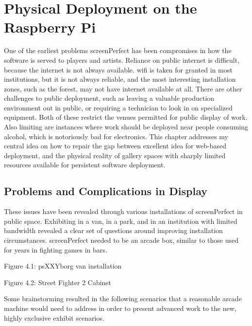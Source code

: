 \section{Physical Deployment on the Raspberry Pi}
One of the earliest problems screenPerfect has been compromises in how the software is served to players and artists. Reliance on public internet is difficult, because the internet is not always available. wifi is taken for granted in most institutions, but it is not always reliable, and the most interesting installation zones, such as the forest, may not have internet available at all. 
There are other challenges to public deployment, such as leaving a valuable production environment out in public, or requiring a technician to look in on specialized equipment. Both of these restrict the venues permitted for public display of work. Also limiting are instances where work should be deployed near people consuming alcohol, which is notoriously bad for electronics.
This chapter addresses my central idea on how to repair the gap between excellent idea for web-based deployment, and the physical reality of gallery spaces with sharply limited resources available for persistent software deployment. 

\subsection{Problems and Complications in Display}
These issues have been revealed through various installations of screenPerfect in public space. Exhibiting in a van, in a park, and in an institution with limited bandwidth revealed a clear set of questions around improving installation circumstances. screenPerfect needed to be an arcade box, similar to those used for years in fighting games in bars.

Figure 4.1: psXXYborg van installation


Figure 4.2: Street Fighter 2 Cabinet


 
Some brainstorming resulted in the following scenarios that a reasonable arcade machine would need to address in order to present advanced work to the new, highly exclusive exhibit scenarios. 

